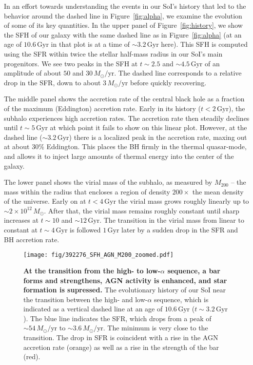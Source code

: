 \documentclass[linenumbers, twocolumn]{aastex631}
\newcommand{\Msun}{\ensuremath{M_{\odot}}}
\newcommand{\Gyr}{\ensuremath{\textrm{Gyr}}}
\newcommand{\Msunyr}{\ensuremath{\Msun/\textrm{yr}}}
\begin{document}
In an effort towards understanding the events in our SoI's history that led to the behavior around the dashed line in Figure~\ref{fig:alpha}, we examine the evolution of some of its key quantities. In the upper panel of Figure~\ref{fig:history}, we show the SFH of our galaxy with the same dashed line as in Figure~\ref{fig:alpha} (at an age of $10.6\,\Gyr$ in that plot is at a time of $\sim3.2\,\Gyr$ here). This SFH is computed using the SFR within twice the stellar half-mass radius in our SoI's main progenitors. We see two peaks in the SFH at $t\sim2.5$ and $\sim4.5\,\Gyr$ of an amplitude of about $50$ and $30\,\Msunyr$. The dashed line corresponds to a relative drop in the SFR, down to about $3\,\Msunyr$ before quickly recovering.

The middle panel shows the accretion rate of the central black hole as a fraction of the maximum (Eddington) accretion rate. Early in its history ($t<2\,\Gyr$), the subhalo experiences high accretion rates. The accretion rate then steadily declines until $t\sim5\,\Gyr$ at which point it fails to show on this linear plot. However, at the dashed line ($\sim3.2\,\Gyr$) there is a localized peak in the accretion rate, maxing out at about $30\%$ Eddington. This places the BH firmly in the thermal quasar-mode, and allows it to inject large amounts of thermal energy into the center of the galaxy.

The lower panel shows the virial mass of the subhalo, as measured by $M_{200}$ -- the mass within the radius that encloses a region of density $200\times$ the mean density of the universe. Early on at $t<4\,\Gyr$ the virial mass grows roughly linearly up to $\sim2\times10^{12}\,\Msun$. After that, the virial mass remains roughly constant until sharp increases at $t\sim10$ and $\sim12\,\Gyr$. The transition in the virial mass from linear to constant at $t\sim4\,\Gyr$ is followed $1\,\Gyr$ later by a sudden drop in the SFR and BH accretion rate.

\begin{figure}
  \centering
  \texttt{[image: fig/392276\_SFH\_AGN\_M200\_zoomed.pdf]}
  \caption{\textbf{At the transition from the high- to low-$\alpha$ sequence, a bar forms and strengthens, AGN activity is enhanced, and star formation is supressed.} The evolutionary history of our SoI near the transition between the high- and low-$\alpha$ sequence, which is indicated as a vertical dashed line at an age of $10.6\,\Gyr$ ($t\sim3.2\,\Gyr$). The blue line indicates the SFR, which drops from a peak of $\sim54\,\Msunyr$ to $\sim3.6\,\Msunyr$. The minimum is very close to the transition. The drop in SFR is coincident with a rise in the AGN accretion rate (orange) as well as a rise in the strength of the bar (red).}
  \label{fig:history_zoom}
\end{figure}
\end{document}
